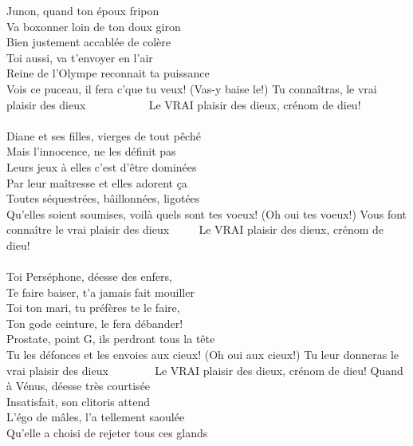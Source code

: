 %
 Junon, quand ton époux fripon
\\Va boxonner loin de ton doux giron
\\Bien justement accablée de colère
\\Toi aussi, va t'envoyer en l'air
\\Reine de l'Olympe reconnait ta puissance
\\Vois ce puceau, il fera c'que tu veux! (Vas-y baise le!)
{Tu connaîtras, le vrai plaisir des dieux  ~~~~~~~~~~}
Le VRAI plaisir des dieux, crénom de dieu!
\\\\Diane et ses filles, vierges de tout pêché
\\Mais l'innocence, ne les définit pas
\\Leurs jeux à elles c'est d'être dominées
\\Par leur maîtresse et elles adorent ça
\\Toutes séquestrées, bâillonnées, ligotées
\\Qu'elles soient soumises, voilà quels sont tes voeux! (Oh oui tes voeux!)
{Vous font connaître le vrai plaisir des dieux  ~~~~}
Le VRAI plaisir des dieux, crénom de dieu!
\\\\Toi Perséphone, déesse des enfers,
\\Te faire baiser, t'a jamais fait mouiller
\\Toi ton mari, tu préfères te le faire,
\\Ton gode ceinture, le fera débander!
\\Prostate, point G, ils perdront tous la tête
\\Tu les défonces et les envoies aux cieux! (Oh oui aux cieux!)
{Tu leur donneras le vrai plaisir des dieux  ~~~~~~~}
Le VRAI plaisir des dieux, crénom de dieu!
\breakpage
Quand à Vénus, déesse très courtisée
\\Insatisfait, son clitoris attend
\\L'égo de mâles, l'a tellement saoulée
\\Qu'elle a choisi de rejeter tous ces glands
